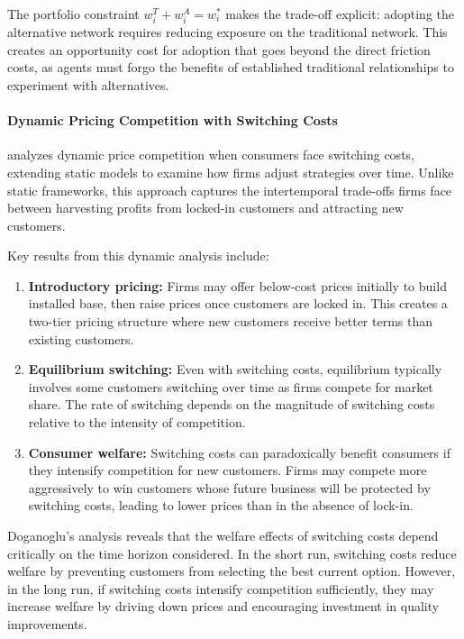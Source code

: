 The portfolio constraint $w_i^T + w_i^A = w_i^*$ makes the trade-off explicit: adopting the alternative network requires reducing exposure on the traditional network. This creates an opportunity cost for adoption that goes beyond the direct friction costs, as agents must forgo the benefits of established traditional relationships to experiment with alternatives.

\paragraph{Dynamic Pricing Competition with Switching Costs}

 analyzes dynamic price competition when consumers face switching costs, extending static models to examine how firms adjust strategies over time. Unlike static frameworks, this approach captures the intertemporal trade-offs firms face between harvesting profits from locked-in customers and attracting new customers.

Key results from this dynamic analysis include:

\begin{enumerate}
    \item \textbf{Introductory pricing:} Firms may offer below-cost prices initially to build installed base, then raise prices once customers are locked in. This creates a two-tier pricing structure where new customers receive better terms than existing customers.
    
    \item \textbf{Equilibrium switching:} Even with switching costs, equilibrium typically involves some customers switching over time as firms compete for market share. The rate of switching depends on the magnitude of switching costs relative to the intensity of competition.
    
    \item \textbf{Consumer welfare:} Switching costs can paradoxically benefit consumers if they intensify competition for new customers. Firms may compete more aggressively to win customers whose future business will be protected by switching costs, leading to lower prices than in the absence of lock-in.
\end{enumerate}

Doganoglu's analysis reveals that the welfare effects of switching costs depend critically on the time horizon considered. In the short run, switching costs reduce welfare by preventing customers from selecting the best current option. However, in the long run, if switching costs intensify competition sufficiently, they may increase welfare by driving down prices and encouraging investment in quality improvements.

